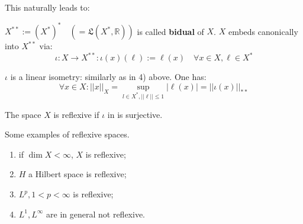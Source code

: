 \documentclass{article}
\begin{document}
This naturally leads to:

\begin{definition}[Bidual]
\label{bidual defnition}
    $X^{**} := (X^*)^* \quad (=\mathfrak{L}(X^*,\mathbb{R}))$ is called \textbf{bidual} of $X$. $X$ embeds canonically into $X^{**}$ via: $$ \iota : X\rightarrow X^{**}: \iota(x)(\ell) := \ell(x) \quad \forall x \in X, \ell \in X^*$$ 
\end{definition}
\begin{remark}
    $\iota$ is a linear isometry: similarly as in  4) above. One has: $$\forall x \in X: ||x||_X = \sup_{l\in X^*, ||\ell|| \leq 1} |\ell(x)| = ||\iota(x)||_{**}$$
\end{remark}

\begin{definition}[Reflexive]\nl
    The space $X$ is reflexive if $\iota$ in  is surjective.
\end{definition}

\begin{example}
\label{reflexive examples}
Some examples of reflexive spaces.  
\begin{enumerate}
    \item if $\dim X<\infty$, $X$ is reflexive;
    \item $H$ a Hilbert space is reflexive;
    \item $L^p, 1<p<\infty$ is reflexive;
    \item $L^1, L^\infty$ are in general not reflexive.
\end{enumerate}
\end{example}
\end{document}
